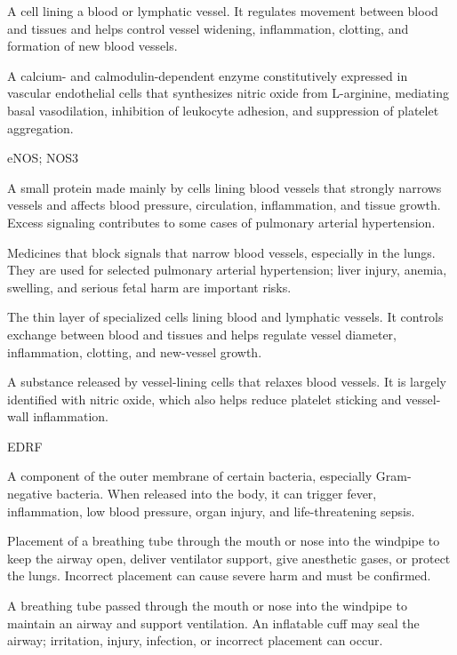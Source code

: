  A cell lining a blood or lymphatic vessel. It regulates movement between blood and tissues and helps control vessel widening, inflammation, clotting, and formation of new blood vessels.

 A calcium- and calmodulin-dependent enzyme constitutively expressed in vascular endothelial cells that synthesizes nitric oxide from L-arginine, mediating basal vasodilation, inhibition of leukocyte adhesion, and suppression of platelet aggregation.

\synonyms
eNOS; NOS3

 A small protein made mainly by cells lining blood vessels that strongly narrows vessels and affects blood pressure, circulation, inflammation, and tissue growth. Excess signaling contributes to some cases of pulmonary arterial hypertension.

 Medicines that block signals that narrow blood vessels, especially in the lungs. They are used for selected pulmonary arterial hypertension; liver injury, anemia, swelling, and serious fetal harm are important risks.

 The thin layer of specialized cells lining blood and lymphatic vessels. It controls exchange between blood and tissues and helps regulate vessel diameter, inflammation, clotting, and new-vessel growth.

 A substance released by vessel-lining cells that relaxes blood vessels. It is largely identified with nitric oxide, which also helps reduce platelet sticking and vessel-wall inflammation.

\synonyms
EDRF

 A component of the outer membrane of certain bacteria, especially Gram-negative bacteria. When released into the body, it can trigger fever, inflammation, low blood pressure, organ injury, and life-threatening sepsis.

 Placement of a breathing tube through the mouth or nose into the windpipe to keep the airway open, deliver ventilator support, give anesthetic gases, or protect the lungs. Incorrect placement can cause severe harm and must be confirmed.

 A breathing tube passed through the mouth or nose into the windpipe to maintain an airway and support ventilation. An inflatable cuff may seal the airway; irritation, injury, infection, or incorrect placement can occur.

